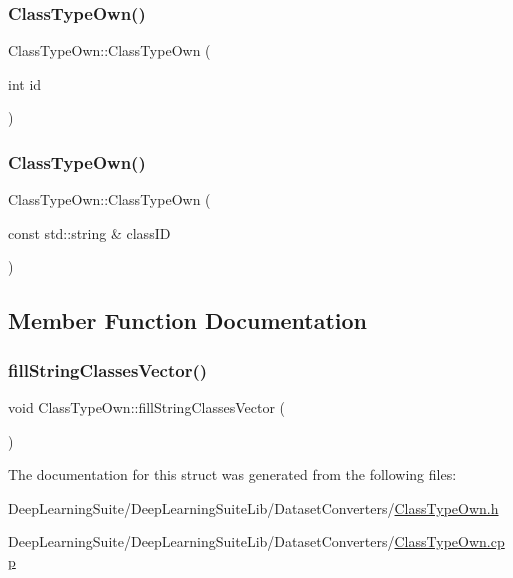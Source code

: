 \subsubsection{\texorpdfstring{Class\+Type\+Own()}{ClassTypeOwn()}\hspace{0.1cm}{\footnotesize\ttfamily [1/2]}}
{\footnotesize\ttfamily Class\+Type\+Own\+::\+Class\+Type\+Own (\begin{DoxyParamCaption}\item[{int}]{id }\end{DoxyParamCaption})}

\mbox{\label{struct_class_type_own_a5a7bbd16b56ab3d470bdfe48a2d1e51b}} 
\subsubsection{\texorpdfstring{Class\+Type\+Own()}{ClassTypeOwn()}\hspace{0.1cm}{\footnotesize\ttfamily [2/2]}}
{\footnotesize\ttfamily Class\+Type\+Own\+::\+Class\+Type\+Own (\begin{DoxyParamCaption}\item[{const std\+::string \&}]{class\+ID }\end{DoxyParamCaption})}



\subsection{Member Function Documentation}
\mbox{\label{struct_class_type_own_a4328aa6d88335c50ea33e1bbe6584d7e}} 
\subsubsection{\texorpdfstring{fill\+String\+Classes\+Vector()}{fillStringClassesVector()}}
{\footnotesize\ttfamily void Class\+Type\+Own\+::fill\+String\+Classes\+Vector (\begin{DoxyParamCaption}{ }\end{DoxyParamCaption})}



The documentation for this struct was generated from the following files\+:\begin{DoxyCompactItemize}
\item 
Deep\+Learning\+Suite/\+Deep\+Learning\+Suite\+Lib/\+Dataset\+Converters/\hyperlink{_class_type_own_8h}{Class\+Type\+Own.\+h}\item 
Deep\+Learning\+Suite/\+Deep\+Learning\+Suite\+Lib/\+Dataset\+Converters/\hyperlink{_class_type_own_8cpp}{Class\+Type\+Own.\+cpp}\end{DoxyCompactItemize}
